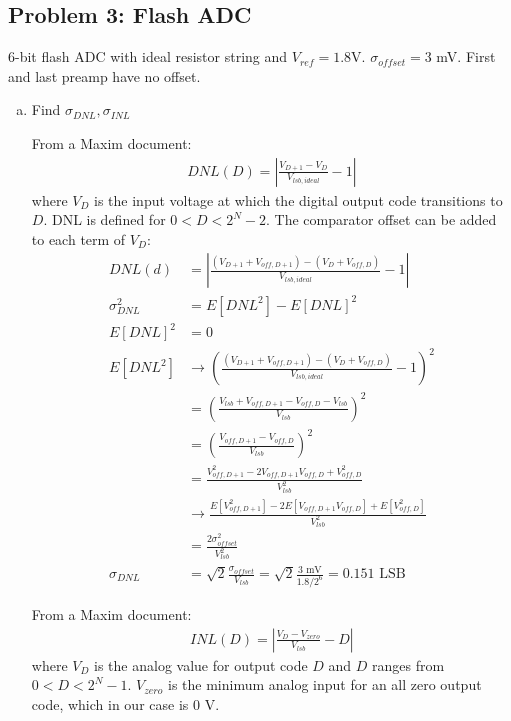 \documentclass[11pt]{article}
\begin{document}
\subsection*{Problem 3: Flash ADC}

6-bit flash ADC with ideal resistor string and $V_{ref} = 1.8$V. $\sigma_{offset} = 3$ mV. First and last preamp have no offset.

\begin{enumerate}[a)]
  \item Find $\sigma_{DNL}, \sigma_{INL}$

    From a Maxim document:
    \begin{align*}
      DNL(D) = \left| \frac{V_{D+1} - V_{D}}{V_{lsb,ideal}} - 1 \right|
    \end{align*}
    where $V_{D}$ is the input voltage at which the digital output code transitions to $D$. DNL is defined for $0 < D < 2^N-2$.
    The comparator offset can be added to each term of $V_{D}$:
    \begin{align*}
      DNL(d) &= \left| \frac{(V_{D+1} + V_{off,D+1}) - (V_{D} + V_{off,D})}{V_{lsb,ideal}} - 1 \right| \\
      \sigma_{DNL}^2 &= E[DNL^2] - E[DNL]^2 \\
      E[DNL]^2 &= 0 \\
      E[DNL^2] &\rightarrow \left( \frac{(V_{D+1} + V_{off,D+1}) - (V_{D} + V_{off,D})}{V_{lsb,ideal}} - 1 \right)^2 \\
      &= \left( \frac{V_{lsb} + V_{off,D+1} - V_{off,D} - V_{lsb}}{V_{lsb}} \right)^2 \\
      &= \left( \frac{V_{off,D+1} - V_{off,D}}{V_{lsb}} \right)^2 \\
      &= \frac{V_{off,D+1}^2 - 2 V_{off,D+1} V_{off,D} + V_{off,D}^2}{V_{lsb}^2} \\
      &\rightarrow \frac{E[V_{off,D+1}^2] - 2 E[V_{off,D+1} V_{off,D}] + E[V_{off,D}^2]}{V_{lsb}^2} \\
      &= \frac{2 \sigma_{offset}^2}{V_{lsb}^2} \\
      \sigma_{DNL} &= \sqrt{2} \frac{\sigma_{offset}}{V_{lsb}} = \sqrt{2} \frac{3 \text{ mV}}{1.8 / 2^6} = 0.151 \text{ LSB}
    \end{align*}

    From a Maxim document:
    \begin{align*}
      INL(D) = \left| \frac{V_D - V_{zero}}{V_{lsb}} - D \right|
    \end{align*}
    where $V_{D}$ is the analog value for output code $D$ and $D$ ranges from $0 < D < 2^N - 1$.
    $V_{zero}$ is the minimum analog input for an all zero output code, which in our case is 0 V.


\end{enumerate}
\end{document}
